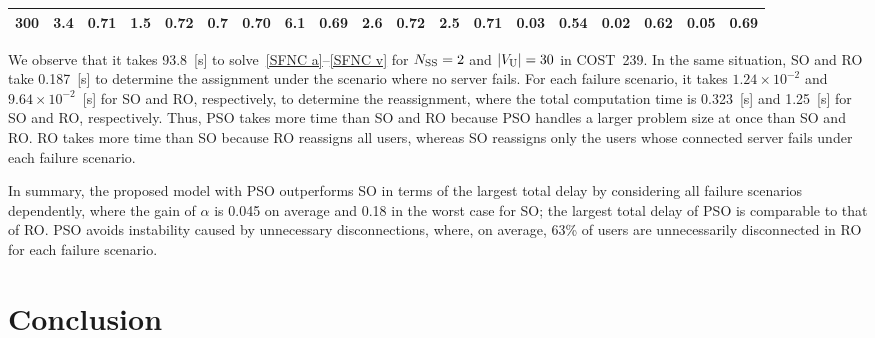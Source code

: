 \documentclass[10pt, letterpaper]{IEEEtran}
\begin{document}
\begin{CJK}{UTF8}{ipxm}
\begin{table*}[t]
\begin{center}
\begin{tabular}{c|cccccc|cccccc|cccccc}
      300 & 3.4 & \hspace{-0.25cm} 0.71 & \hspace{-0.25cm} 1.5 & \hspace{-0.25cm} 0.72 & \hspace{-0.25cm} 0.7 & \hspace{-0.25cm} 0.70 & 6.1 & \hspace{-0.25cm} 0.69 & \hspace{-0.25cm} 2.6 & \hspace{-0.25cm} 0.72 & \hspace{-0.25cm} 2.5 & \hspace{-0.25cm} 0.71 & 0.03 & \hspace{-0.25cm} 0.54 & \hspace{-0.25cm} 0.02 & \hspace{-0.25cm} 0.62 & \hspace{-0.25cm} 0.05 & \hspace{-0.25cm} 0.69 \\
      \hline
    \end{tabular}
  \end{center}
\end{table*}

We observe that it takes 93.8~[s] to solve~\eqref{SFNC a}--\eqref{SFNC v} for $N_{\rm{SS}}=2$ and $|V_{\rm U}|=30$ in COST~239.
In the same situation, SO and RO take 0.187~[s] to determine the assignment under the scenario where no server fails.
For each failure scenario, it takes $1.24 \times 10^{-2}$ and $9.64 \times 10^{-2}$~[s] for SO and RO, respectively, to determine the reassignment, 
where the total computation time is 0.323~[s] and 1.25~[s] for SO and RO, respectively.
Thus, PSO takes more time than SO and RO because PSO handles a larger problem size at once than SO and RO.
RO takes more time than SO because RO reassigns all users, whereas SO reassigns only the users whose connected server fails under each failure scenario.

In summary, the proposed model with PSO outperforms SO in terms of the largest total delay by considering all failure scenarios dependently, where the gain of $\alpha$ is 0.045 on average
and 0.18 in the worst case for SO;
the largest total delay of PSO is comparable to that of RO.
PSO avoids instability caused by unnecessary disconnections, where, on average, 63\% of users are unnecessarily disconnected in RO for each failure scenario.


\section{Conclusion}
\label{sec:conclusion}



\end{CJK}
\end{document}
